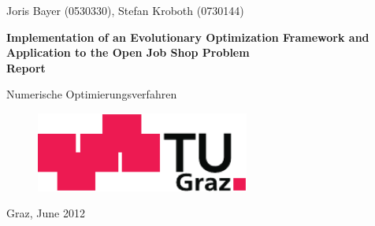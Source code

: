 \date{\today}

\begin{titlepage}
  \pagestyle{empty}
  
  \begin{center}
    {\sc\Large Joris Bayer (0530330), Stefan Kroboth (0730144)}

    \vspace*{3cm}

    {\sffamily\bfseries\Huge Implementation of an Evolutionary Optimization Framework and Application to the Open Job Shop Problem\\}
    \vspace*{0.5cm}
    {\sffamily\bfseries\Large Report}

    \vspace*{2cm}

    {\sc\Large Numerische Optimierungsverfahren}

    \vspace*{3cm}

    \begin{figure}[H]
      \begin{center}
        \includegraphics[width=7cm]{tug.pdf}
      \end{center}
    \end{figure}

    \vspace*{1.5cm}

    \vspace*{2cm}

    \vspace*{\fill}

    Graz, June 2012 
  \end{center}
\end{titlepage}
